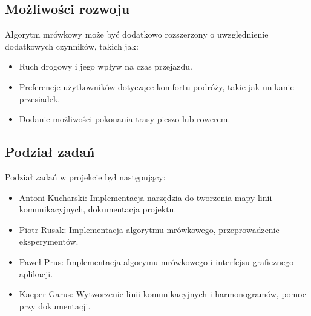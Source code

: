 \documentclass{article}
\begin{document}
\subsection{Możliwości rozwoju}
Algorytm mrówkowy może być dodatkowo rozszerzony o uwzględnienie dodatkowych czynników, takich jak:
\begin{itemize}
    \item Ruch drogowy i jego wpływ na czas przejazdu.
    \item Preferencje użytkowników dotyczące komfortu podróży, takie jak unikanie przesiadek.
    \item Dodanie możliwości pokonania trasy pieszo lub rowerem.
\end{itemize}

\subsection{Podział zadań}
Podział zadań w projekcie był następujący:
\begin{itemize}
    \item Antoni Kucharski: Implementacja narzędzia do tworzenia mapy linii komunikacyjnych, dokumentacja projektu.
    \item Piotr Rusak: Implementacja algorytmu mrówkowego, przeprowadzenie eksperymentów.
    \item Paweł Prus: Implementacja algorymu mrówkowego i interfejsu graficznego aplikacji.
    \item Kacper Garus: Wytworzenie linii komunikacyjnych i harmonogramów, pomoc przy dokumentacji.
\end{itemize}
\end{document}
